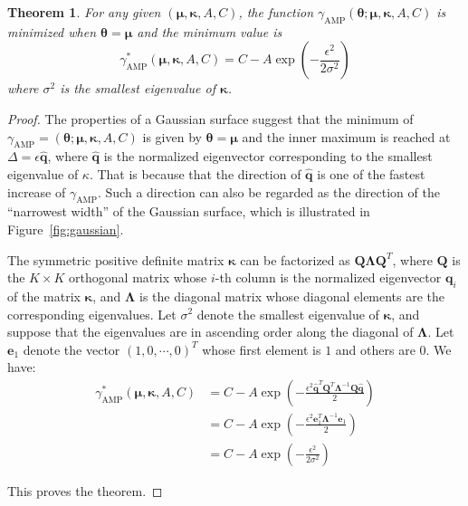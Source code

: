 \documentclass[final]{cvpr}
\newtheorem{theorem}{Theorem}
\begin{document}
\begin{theorem}
For any given $(\boldsymbol{\mu},\boldsymbol{\kappa},A,C)$, the function $\gamma_\mathrm{AMP}(\boldsymbol{\theta};\boldsymbol{\mu},\boldsymbol{\kappa},A,C)$ is minimized when $\boldsymbol{\theta}=\boldsymbol{\mu}$ and the minimum value is
\begin{equation}
\gamma_\mathrm{AMP}^\ast(\boldsymbol{\mu},\boldsymbol{\kappa},A,C)=C-A\exp\left(-\frac{\epsilon^2}{2\sigma^2}\right)
\end{equation}
where $\sigma^2$ is the smallest eigenvalue of $\boldsymbol{\kappa}$.
\end{theorem}

\begin{proof}
The properties of a Gaussian surface suggest that the minimum of $\gamma_\mathrm{AMP}=(\boldsymbol{\theta};\boldsymbol{\mu},\boldsymbol{\kappa},A,C)$ is given by $\boldsymbol{\theta}=\boldsymbol{\mu}$ and the inner maximum is reached at $\Delta=\epsilon\widehat{\boldsymbol{q}}$, where $\widehat{\boldsymbol{q}}$ is the normalized eigenvector corresponding to the smallest eigenvalue of $\kappa$. That is because that the direction of $\widehat{\boldsymbol{q}}$ is one of the fastest increase of $\gamma_\mathrm{AMP}$. Such a direction can also be regarded as the direction of the ``narrowest width'' of the Gaussian surface, which is illustrated in Figure~\ref{fig:gaussian}.

The symmetric positive definite matrix $\boldsymbol{\kappa}$ can be factorized as $\boldsymbol{Q}\boldsymbol{\Lambda}\boldsymbol{Q}^T$, where $\boldsymbol{Q}$ is the $K\times K$ orthogonal matrix whose $i$-th column is the normalized eigenvector $\boldsymbol{q}_i$ of the matrix $\boldsymbol{\kappa}$, and $\boldsymbol{\Lambda}$ is the diagonal matrix whose diagonal elements are the corresponding eigenvalues. Let $\sigma^2$ denote the smallest eigenvalue of $\boldsymbol{\kappa}$, and suppose that the eigenvalues are in ascending order along the diagonal of $\boldsymbol{\Lambda}$. Let $\boldsymbol{e}_1$ denote the vector $(1,0,\cdots,0)^T$ whose first element is $1$ and others are $0$. We have:
\begin{align}
\gamma^\ast_\mathrm{AMP}(\boldsymbol{\mu},\boldsymbol{\kappa},A,C)
&=C-A\exp\left(-\frac{\epsilon^2\widehat{\boldsymbol{q}}^T\boldsymbol{Q}^T\boldsymbol{\Lambda}^{-1}\boldsymbol{Q}\widehat{\boldsymbol{q}}}{2}\right)\nonumber\\
&=C-A\exp\left(-\frac{\epsilon^2\boldsymbol{e}_1^T\boldsymbol{\Lambda}^{-1}\boldsymbol{e}_1}{2}\right)\nonumber\\
&=C-A\exp\left(-\frac{\epsilon^2}{2\sigma^2}\right)
\end{align}

This proves the theorem.
\end{proof}
\end{document}
